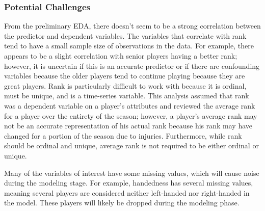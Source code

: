 \documentclass[
]{article}
\begin{document}
\hypertarget{potential-challenges}{%
\subsubsection{Potential Challenges}\label{potential-challenges}}

From the preliminary EDA, there doesn't seem to be a strong correlation
between the predictor and dependent variables. The variables that
correlate with rank tend to have a small sample size of observations in
the data. For example, there appears to be a slight correlation with
senior players having a better rank; however, it is uncertain if this is
an accurate predictor or if there are confounding variables because the
older players tend to continue playing because they are great players.
Rank is particularly difficult to work with because it is ordinal, must
be unique, and is a time-series variable. This analysis assumed that
rank was a dependent variable on a player's attributes and reviewed the
average rank for a player over the entirety of the season; however, a
player's average rank may not be an accurate representation of his
actual rank because his rank may have changed for a portion of the
season due to injuries. Furthermore, while rank should be ordinal and
unique, average rank is not required to be either ordinal or unique.

Many of the variables of interest have some missing values, which will
cause noise during the modeling stage. For example, handedness has
several missing values, meaning several players are considered neither
left-handed nor right-handed in the model. These players will likely be
dropped during the modeling phase.
\end{document}
